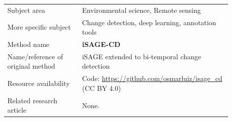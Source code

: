\begin{table}[!h]
\centering
\begin{tabular}{p{0.30\linewidth}p{0.60\linewidth}}
\toprule
Subject area              & Environmental science, Remote sensing \\
More specific subject     & Change detection, deep learning, annotation tools \\
Method name               & \textbf{iSAGE-CD} \\
Name/reference of original method & iSAGE \cite{isage} extended to bi-temporal
                            change detection \\
Resource availability     & Code: \url{https://github.com/osmarluiz/isage_cd}
                            (CC BY 4.0) \\
Related research article  & None. \\
\bottomrule
\end{tabular}
\end{table}
